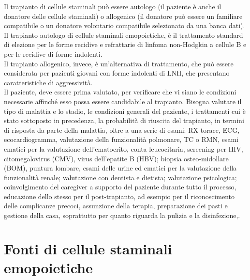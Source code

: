 Il trapianto di cellule staminali può essere autologo (il paziente è anche il donatore delle cellule staminali) 
o allogenico (il donatore può essere un familiare compatibile o un donatore volontario compatibile selezionato da una 
banca dati)\cite{LLS}.\\
Il trapianto autologo di cellule staminali emopoietiche, è il trattamento standard di elezione per le forme recidive e 
refrattarie di linfoma non-Hodgkin a cellule B\cite{TRANS} e per le recidive di forme indolenti.\\ 
Il trapianto allogenico, invece, è un’alternativa di trattamento, che può essere considerata per pazienti giovani con forme 
indolenti di LNH, che presentano caratteristiche di aggressività\cite{LLS}.\\
Il paziente, deve essere prima valutato, per verificare che vi siano le condizioni necessarie
affinché esso possa essere candidabile al trapianto. 
Bisogna valutare il tipo di malattia e lo stadio, le condizioni generali del paziente, i trattamenti cui è stato 
sottoposto in precedenza, la probabilità di riuscita del trapianto, in termini di risposta da parte della malattia, 
oltre a una serie di esami: RX torace, ECG, ecocardiogramma, valutazione della funzionalità polmonare, TC o RMN, 
esami ematici per la valutazione dell’ematocrito, conta leucocitaria, screening per HIV, citomegalovirus (CMV), 
virus dell’epatite B (HBV); biopsia osteo-midollare (BOM), puntura lombare, esami delle urine ed ematici per la 
valutazione della funzionalità renale; valutazione con dentista e dietista; valutazione psicologica; 
coinvolgimento del caregiver a supporto del paziente durante tutto il processo, educazione dello stesso per il 
post-trapianto, ad esempio per il riconoscimento delle complicanze precoci, assunzione della terapia, preparazione 
dei pasti e gestione della casa, soprattutto per quanto riguarda la pulizia e la disinfezione\cite{LLS},\cite{STEMCELLS}.

\section{Fonti di cellule staminali emopoietiche}

